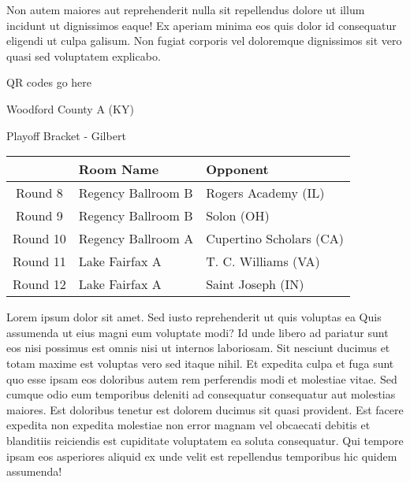 \documentclass{article}%
\begin{document}
\newline%
Non autem maiores aut reprehenderit nulla sit repellendus dolore ut illum incidunt ut dignissimos eaque! Ex aperiam minima eos quis dolor id consequatur eligendi ut culpa galisum. Non fugiat corporis vel doloremque dignissimos sit vero quasi sed voluptatem explicabo.\newline%
\newline%
%
\vspace*{30pt}%
\begin{center}%
\begin{Huge}%
QR codes go here%
\end{Huge}%
\end{center}%
\newpage%
\begin{center}%
\begin{Huge}%
Woodford County A (KY)%
\end{Huge}%
\vspace*{8pt}%
\linebreak%
\begin{Large}%
Playoff Bracket {-} Gilbert%
\end{Large}%
\end{center}%
\begin{tabularx}{\textwidth}{|c|Y|Y|}%
\hline%
&Room Name&Opponent\\%
\hline%
Round 8&Regency Ballroom B&Rogers Academy (IL)\\%
Round 9&Regency Ballroom B&Solon (OH)\\%
Round 10&Regency Ballroom A&Cupertino Scholars (CA)\\%
Round 11&Lake Fairfax A&T. C. Williams (VA)\\%
Round 12&Lake Fairfax A&Saint Joseph (IN)\\%
\hline%
\end{tabularx}%
\vspace*{8pt}%
\linebreak%
\newline%
\newline%
Lorem ipsum dolor sit amet. Sed iusto reprehenderit ut quis voluptas ea Quis assumenda ut eius magni eum voluptate modi? Id unde libero ad pariatur sunt eos nisi possimus est omnis nisi ut internos laboriosam. Sit nesciunt ducimus et totam maxime est voluptas vero sed itaque nihil. Et expedita culpa et fuga sunt quo esse ipsam eos doloribus autem rem perferendis modi et molestiae vitae.\newline%
\newline%
Sed cumque odio eum temporibus deleniti ad consequatur consequatur aut molestias maiores. Est doloribus tenetur est dolorem ducimus sit quasi provident. Est facere expedita non expedita molestiae non error magnam vel obcaecati debitis et blanditiis reiciendis est cupiditate voluptatem ea soluta consequatur. Qui tempore ipsam eos asperiores aliquid ex unde velit est repellendus temporibus hic quidem assumenda!\newline%
\end{document}
